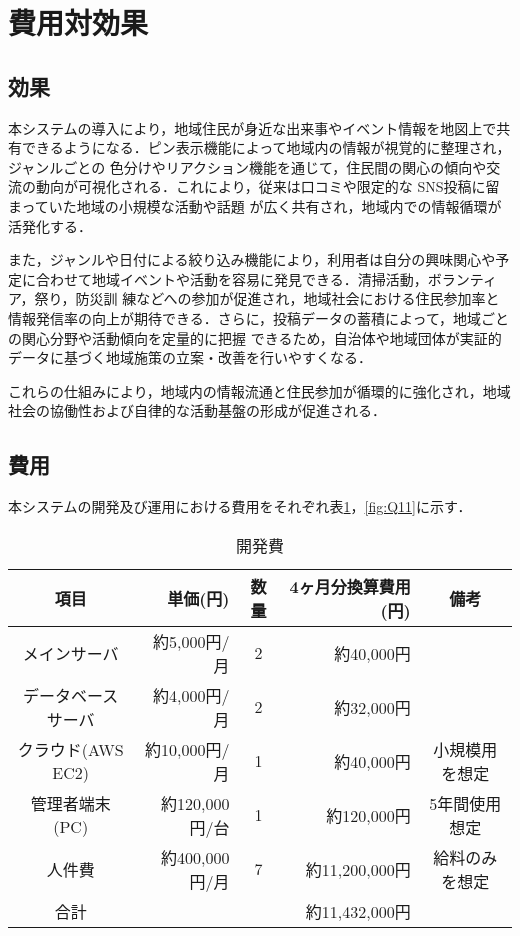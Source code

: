 \section{費用対効果}
\subsection{効果}
本システムの導入により，地域住民が身近な出来事やイベント情報を地図上で共有できるようになる．ピン表示機能によって地域内の情報が視覚的に整理され，ジャンルごとの
色分けやリアクション機能を通じて，住民間の関心の傾向や交流の動向が可視化される．これにより，従来は口コミや限定的な SNS投稿に留まっていた地域の小規模な活動や話題
が広く共有され，地域内での情報循環が活発化する．\par
また，ジャンルや日付による絞り込み機能により，利用者は自分の興味関心や予定に合わせて地域イベントや活動を容易に発見できる．清掃活動，ボランティア，祭り，防災訓
練などへの参加が促進され，地域社会における住民参加率と情報発信率の向上が期待できる．さらに，投稿データの蓄積によって，地域ごとの関心分野や活動傾向を定量的に把握
できるため，自治体や地域団体が実証的データに基づく地域施策の立案・改善を行いやすくなる． \par
これらの仕組みにより，地域内の情報流通と住民参加が循環的に強化され，地域社会の協働性および自律的な活動基盤の形成が促進される．

\subsection{費用}
本システムの開発及び運用における費用をそれぞれ表\ref{fig:Q10}，\ref{fig:Q11}に示す．
\clearpage

\begin{table}[h]
  \centering
  \caption{開発費}
  \label{fig:Q10}
  \begin{tabular}{crcrc}
  \hline
  項目  & 単価(円) & 数量   & 4ヶ月分換算費用(円) & 備考\\ \hline\hline
  
メインサーバ  & 約5,000円/月 & 2  & 約40,000円&  \\ \hline

データベースサーバ & 約4,000円/月 & 2  & 約32,000円& \\\hline

クラウド(AWS EC2) &約10,000円/月 &1 & 約40,000円& 小規模用を想定\\ \hline

管理者端末(PC) & 約120,000円/台& 1& 約120,000円& 5年間使用想定 \\ \hline

人件費　 & 約400,000円/月 & 7& 約11,200,000円& 給料のみを想定\\ \hline\hline

合計　& & & 約11,432,000円\\ \hline
\end{tabular}
\end{table}



